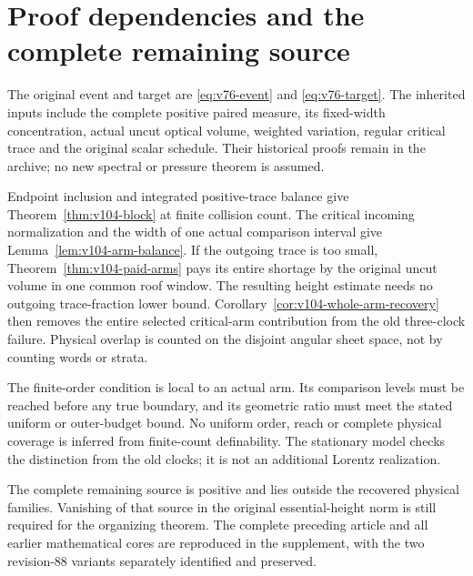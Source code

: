 \section{Proof dependencies and the complete remaining source}
\label{app:v104-dependencies}
The original event and target are \eqref{eq:v76-event} and
\eqref{eq:v76-target}. The inherited inputs include the complete
positive paired measure, its fixed-width concentration, actual uncut
optical volume, weighted variation, regular critical trace and the
original scalar schedule. Their historical proofs remain in the
archive; no new spectral or pressure theorem is assumed.

Endpoint inclusion and integrated positive-trace balance give
Theorem~\ref{thm:v104-block} at finite collision count. The critical
incoming normalization and the width of one actual comparison interval
give Lemma~\ref{lem:v104-arm-balance}. If the outgoing trace is too
small, Theorem~\ref{thm:v104-paid-arms} pays its entire shortage by
the original uncut volume in one common roof window. The resulting
height estimate needs no outgoing trace-fraction lower bound.
Corollary~\ref{cor:v104-whole-arm-recovery} then removes the entire
selected critical-arm contribution from the old three-clock failure.
Physical overlap is counted on the disjoint angular sheet space,
not by counting words or strata.

The finite-order condition is local to an actual arm. Its comparison
levels must be reached before any true boundary, and its geometric
ratio must meet the stated uniform or outer-budget bound. No uniform
order, reach or complete physical coverage is inferred from
finite-count definability. The stationary model checks the distinction
from the old clocks; it is not an additional Lorentz realization.

The complete remaining source is positive and lies outside the
recovered physical families. Vanishing of that source in the original
essential-height norm is still required for the organizing theorem.
The complete preceding article and all earlier mathematical cores
are reproduced in the supplement, with the two revision-88 variants
separately identified and preserved.
